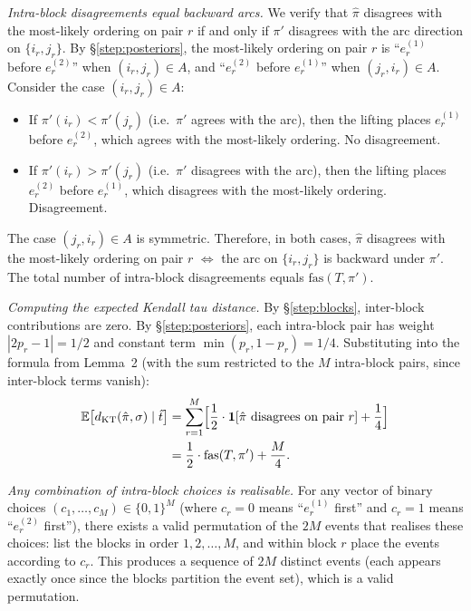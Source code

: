 \documentclass[11pt]{article}
\begin{document}
\noindent\emph{Intra-block disagreements equal backward arcs.}
We verify that $\hat{\pi}$ disagrees with the most-likely ordering on pair $r$ if and only if $\pi'$ disagrees with the arc direction on $\{i_r, j_r\}$. By \S\ref{step:posteriors}, the most-likely ordering on pair $r$ is ``$e_r^{(1)}$ before $e_r^{(2)}$'' when $(i_r, j_r) \in A$, and ``$e_r^{(2)}$ before $e_r^{(1)}$'' when $(j_r, i_r) \in A$. Consider the case $(i_r, j_r) \in A$:
\begin{itemize}
\item If $\pi'(i_r) < \pi'(j_r)$ (i.e.\ $\pi'$ agrees with the arc), then the lifting places $e_r^{(1)}$ before $e_r^{(2)}$, which agrees with the most-likely ordering. No disagreement.
\item If $\pi'(i_r) > \pi'(j_r)$ (i.e.\ $\pi'$ disagrees with the arc), then the lifting places $e_r^{(2)}$ before $e_r^{(1)}$, which disagrees with the most-likely ordering. Disagreement.
\end{itemize}
The case $(j_r, i_r) \in A$ is symmetric. Therefore, in both cases, $\hat{\pi}$ disagrees with the most-likely ordering on pair $r$ $\iff$ the arc on $\{i_r, j_r\}$ is backward under $\pi'$. The total number of intra-block disagreements equals $\mathrm{fas}(T, \pi')$.

\smallskip
\noindent\emph{Computing the expected Kendall tau distance.}
By \S\ref{step:blocks}, inter-block contributions are zero. By \S\ref{step:posteriors}, each intra-block pair has weight $|2p_r - 1| = 1/2$ and constant term $\min(p_r, 1-p_r) = 1/4$. Substituting into the formula from Lemma~2 (with the sum restricted to the $M$ intra-block pairs, since inter-block terms vanish):
\begin{align}
\mathbb{E}\bigl[d_{\mathrm{KT}}(\hat{\pi}, \sigma) \mid \hat{t}\bigr]
&= \sum_{r=1}^{M} \Bigl[\frac{1}{2} \cdot \mathbf{1}[\hat{\pi} \text{ disagrees on pair } r] + \frac{1}{4}\Bigr] \notag \\
&= \frac{1}{2} \cdot \mathrm{fas}(T, \pi') + \frac{M}{4}.
\end{align}

\smallskip
\noindent\emph{Any combination of intra-block choices is realisable.}
For any vector of binary choices $(c_1, \ldots, c_M) \in \{0, 1\}^M$ (where $c_r = 0$ means ``$e_r^{(1)}$ first'' and $c_r = 1$ means ``$e_r^{(2)}$ first''), there exists a valid permutation of the $2M$ events that realises these choices: list the blocks in order $1, 2, \ldots, M$, and within block $r$ place the events according to $c_r$. This produces a sequence of $2M$ distinct events (each appears exactly once since the blocks partition the event set), which is a valid permutation.
\end{document}

